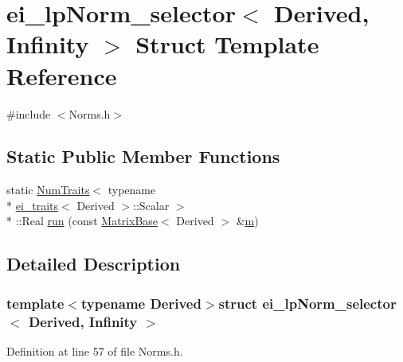 \hypertarget{structei__lp_norm__selector_3_01_derived_00_01_infinity_01_4}{\section{ei\-\_\-lp\-Norm\-\_\-selector$<$ Derived, Infinity $>$ Struct Template Reference}
\label{structei__lp_norm__selector_3_01_derived_00_01_infinity_01_4}
}


{\ttfamily \#include $<$Norms.\-h$>$}

\subsection*{Static Public Member Functions}
\begin{DoxyCompactItemize}
\item 
static \hyperlink{struct_num_traits}{Num\-Traits}$<$ typename \\*
\hyperlink{structei__traits}{ei\-\_\-traits}$<$ Derived $>$\-::Scalar $>$\\*
\-::Real \hyperlink{structei__lp_norm__selector_3_01_derived_00_01_infinity_01_4_ac7a55c22b7de3f3087840bb9ff8d1bdb}{run} (const \hyperlink{class_matrix_base}{Matrix\-Base}$<$ Derived $>$ \&\hyperlink{glext_8h_af593500c283bf1a787a6f947f503a5c2}{m})
\end{DoxyCompactItemize}


\subsection{Detailed Description}
\subsubsection*{template$<$typename Derived$>$struct ei\-\_\-lp\-Norm\-\_\-selector$<$ Derived, Infinity $>$}



Definition at line 57 of file Norms.\-h.



